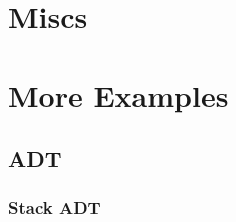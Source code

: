 \documentclass[oneside,11pt,dvipsnames]{book}
\begin{document}
\chapter{Miscs}





\chapter{More Examples}
\section{ADT}
\subsection{Stack ADT}
\end{document}
